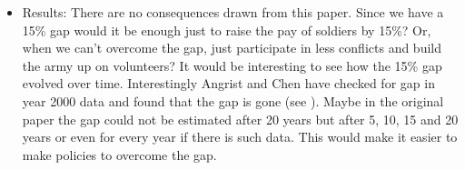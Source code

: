 \documentclass{article}
\begin{document}
\begin{enumerate}[label=(\alph*)]
\begin{itemize}
			\item Results: There are no consequences drawn from this paper. Since we have a 15\% gap would it be enough just to raise the pay of soldiers by 15\%? Or, when we can't overcome the gap, just participate in less conflicts and build the army up on volunteers? It would be interesting to see how the 15\% gap evolved over time. Interestingly Angrist and Chen have checked for gap in year 2000 data and found that the gap is gone (see \cite{angrist_chen_2008}). Maybe in the original paper the gap could not be estimated after 20 years but after 5, 10, 15 and 20 years or even for every year if there is such data. This would make it easier to make policies to overcome the gap. 
		\end{itemize}
	\end{enumerate}
\end{document}
